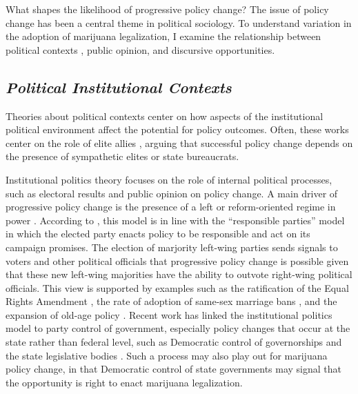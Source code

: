 

What shapes the likelihood of progressive policy change? The issue of policy change has been a central theme in political sociology. To understand variation in the adoption of marijuana legalization, I examine the relationship between political contexts%
, public opinion, and discursive opportunities.


\subsection{\it{Political Institutional Contexts}}

Theories about political contexts center on how aspects of the institutional political environment affect the potential for policy outcomes. Often, these works center on the role of elite allies \citep{amenta_et_al_1994,amenta_2006}, arguing that successful policy change depends on the presence of sympathetic elites or state bureaucrats. 

Institutional politics theory focuses on the role of internal political processes, such as electoral results and public opinion on policy change. A main driver of progressive policy change is the presence of a left or reform-oriented regime in power \citep{amenta_et_al_2005,korpi_1983}. According to \citet{amenta_and_elliott_2019}, this model is in line with the ``responsible parties'' model \citep{schattschneider_1942} in which the elected party enacts policy to be responsible and act on its campaign promises. The election of marjority left-wing parties sends signals to voters and other political officials that progressive policy change is possible given that these new left-wing majorities have the ability to outvote right-wing political officials.  This view is supported by examples such as the ratification of the Equal Rights Amendment \citep{soule_and_olzak_2004,soule_and_king_2006}, the rate of adoption of same-sex marriage bans \citep{soule_2004,mcveigh_and_diaz_2009}, and the expansion of old-age policy \citep{amenta_and_elliott_2019,amenta_et_al_2005}. Recent work has linked the institutional politics model to party control of government, especially policy changes that occur at the state rather than federal level, such as Democratic control of governorships and the state legislative bodies \citep{amenta_and_elliott_2019}. Such a process may also play out for marijuana policy change, in that Democratic control of state governments may signal that the opportunity is right to enact marijuana legalization.


